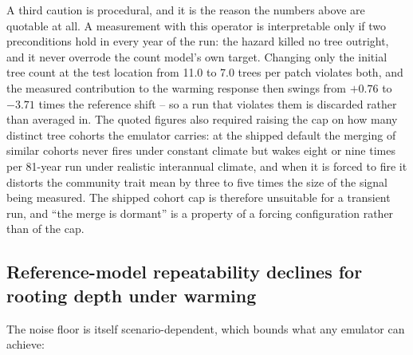 \documentclass[11pt]{article}
\begin{document}
A third caution is procedural, and it is the reason the numbers above are quotable at all. A measurement with this operator is interpretable only if two preconditions hold in every year of the run: the hazard killed no tree outright, and it never overrode the count model's own target. Changing only the initial tree count at the test location from 11.0 to 7.0 trees per patch violates both, and the measured contribution to the warming response then swings from $+0.76$ to $-3.71$ times the reference shift -- so a run that violates them is discarded rather than averaged in. The quoted figures also required raising the cap on how many distinct tree cohorts the emulator carries: at the shipped default the merging of similar cohorts never fires under constant climate but wakes eight or nine times per 81-year run under realistic interannual climate, and when it is forced to fire it distorts the community trait mean by three to five times the size of the signal being measured. The shipped cohort cap is therefore unsuitable for a transient run, and ``the merge is dormant'' is a property of a forcing configuration rather than of the cap.

\subsection{Reference-model repeatability declines for rooting depth under warming}

The noise floor is itself scenario-dependent, which bounds what any emulator can achieve:
\end{document}
